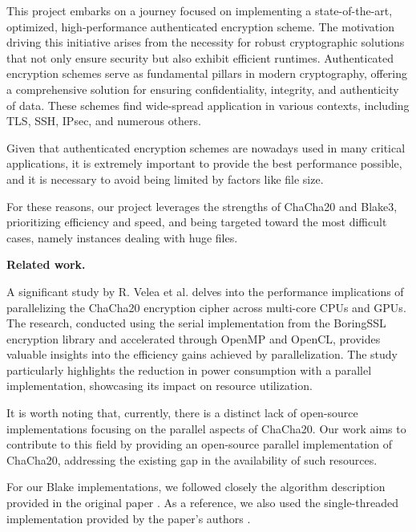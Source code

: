 \documentclass[letterpaper]{article}
\newcommand{\mypar}[1]{{\bf #1.}}
\begin{document}
This project embarks on a journey focused on implementing a state-of-the-art, optimized, high-performance authenticated encryption scheme. The motivation driving this initiative arises from the necessity for robust cryptographic solutions that not only ensure security but also exhibit efficient runtimes. Authenticated encryption schemes serve as fundamental pillars in modern cryptography, offering a comprehensive solution for ensuring confidentiality, integrity, and authenticity of data. 
These schemes find wide-spread application in various contexts, including TLS, SSH, IPsec, and numerous others.


Given that authenticated encryption schemes are nowadays used in many critical applications, it is extremely important to provide the best performance possible, and it is necessary to avoid being limited by factors like file size.

For these reasons, our project leverages the strengths of ChaCha20 and Blake3, prioritizing efficiency and speed, and being targeted toward the most difficult cases, namely instances dealing with huge files.

\mypar{Related work}

A significant study by R. Velea et al. \cite{parallelchacha} delves into the performance implications of parallelizing the ChaCha20 encryption cipher across multi-core CPUs and GPUs. The research, conducted using the serial implementation from the BoringSSL encryption library and accelerated through OpenMP and OpenCL, provides valuable insights into the efficiency gains achieved by parallelization. The study particularly highlights the reduction in power consumption with a parallel implementation, showcasing its impact on resource utilization.

It is worth noting that, currently, there is a distinct lack of open-source implementations focusing on the parallel aspects of ChaCha20. Our work aims to contribute to this field by providing an open-source parallel implementation of ChaCha20, addressing the existing gap in the availability of such resources.

For our Blake implementations, we followed closely the algorithm description provided in the original paper \cite{blake}. As a reference, we also used the single-threaded implementation provided by the paper's authors \cite{gitblake}.
\end{document}
